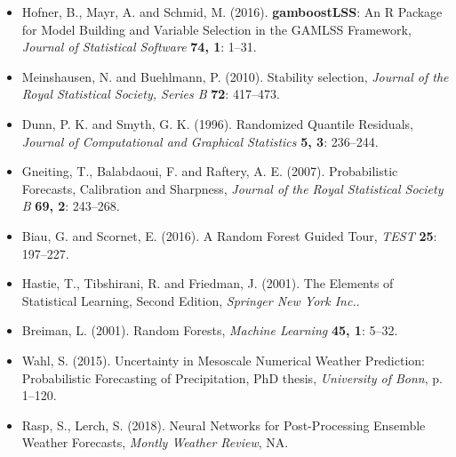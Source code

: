 \documentclass[american,foldmarks=false,noconfig]{uibklttr}
\begin{document}
\begin{itemize}[leftmargin=*]
\item[] Hofner, B., Mayr, A. and Schmid, M. (2016). 
\textbf{gamboostLSS}: An \textsf{R} Package for Model Building and 
Variable Selection in the {GAMLSS} Framework,
\textit{Journal of Statistical Software} \textbf{74, 1}: 1--31.


\item[] Meinshausen, N. and Buehlmann, P. (2010). 
Stability selection,
\textit{Journal of the Royal Statistical Society, Series B} 
\textbf{72}: 417--473.

\item[] Dunn, P. K. and Smyth, G. K. (1996).
Randomized Quantile Residuals,
\textit{Journal of Computational and Graphical Statistics}
\textbf{5, 3}: 236--244.

\item[] Gneiting, T., Balabdaoui, F. and Raftery, A. E. (2007).
Probabilistic Forecasts, Calibration and Sharpness,
\textit{Journal of the Royal Statistical Society B}
\textbf{69, 2}: 243--268.

\item[] Biau, G. and Scornet, E. (2016).
A Random Forest Guided Tour,
\textit{TEST}
\textbf{25}: 197--227.

\item[] Hastie, T., Tibshirani, R. and Friedman, J. (2001).
The Elements of Statistical Learning, Second Edition,
\textit{Springer New York Inc.}.

\item[] Breiman, L. (2001).
Random Forests,
\textit{Machine Learning}
\textbf{45, 1}: 5--32.

\item[] Wahl, S. (2015). Uncertainty in Mesoscale Numerical Weather Prediction:
Probabilistic Forecasting of Precipitation, PhD thesis, 
\textit{University of Bonn}, p. 1--120.%

\item[] Rasp, S., Lerch, S. (2018). Neural Networks for Post-Processing Ensemble
Weather Forecasts, \textit{Montly Weather Review}, NA.

\end{itemize}
\end{document}
